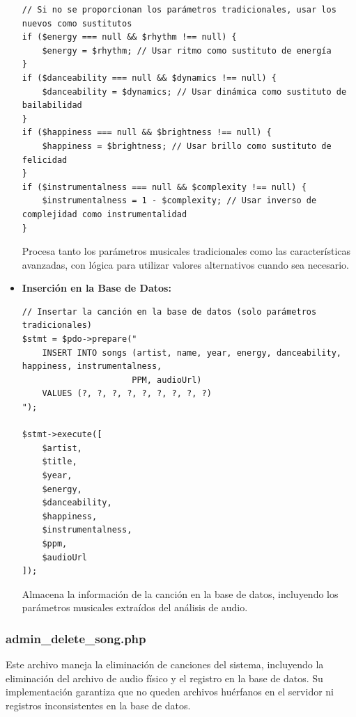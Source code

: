 \documentclass[a4paper,12pt]{article}
\begin{document}
\begin{itemize}
\begin{verbatim}
// Si no se proporcionan los parámetros tradicionales, usar los nuevos como sustitutos
if ($energy === null && $rhythm !== null) {
    $energy = $rhythm; // Usar ritmo como sustituto de energía
}
if ($danceability === null && $dynamics !== null) {
    $danceability = $dynamics; // Usar dinámica como sustituto de bailabilidad
}
if ($happiness === null && $brightness !== null) {
    $happiness = $brightness; // Usar brillo como sustituto de felicidad
}
if ($instrumentalness === null && $complexity !== null) {
    $instrumentalness = 1 - $complexity; // Usar inverso de complejidad como instrumentalidad
}
    \end{verbatim}
    Procesa tanto los parámetros musicales tradicionales como las características avanzadas, con lógica para utilizar valores alternativos cuando sea necesario.
    
    \item \textbf{Inserción en la Base de Datos:}
    \begin{verbatim}
// Insertar la canción en la base de datos (solo parámetros tradicionales)
$stmt = $pdo->prepare("
    INSERT INTO songs (artist, name, year, energy, danceability, happiness, instrumentalness, 
                      PPM, audioUrl)
    VALUES (?, ?, ?, ?, ?, ?, ?, ?, ?)
");

$stmt->execute([
    $artist,
    $title,
    $year,
    $energy,
    $danceability,
    $happiness,
    $instrumentalness,
    $ppm,
    $audioUrl
]);
    \end{verbatim}
    Almacena la información de la canción en la base de datos, incluyendo los parámetros musicales extraídos del análisis de audio.
\end{itemize}

\subsubsection{admin\_delete\_song.php}

Este archivo maneja la eliminación de canciones del sistema, incluyendo la eliminación del archivo de audio físico y el registro en la base de datos. Su implementación garantiza que no queden archivos huérfanos en el servidor ni registros inconsistentes en la base de datos.
\end{document}
